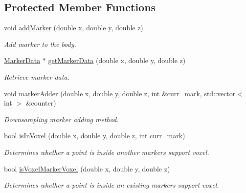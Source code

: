 \subsection*{Protected Member Functions}
\begin{DoxyCompactItemize}
\item 
void \hyperlink{class_body_aa965f7b498528230aa2f56a9abf6bf06}{add\+Marker} (double x, double y, double z)
\begin{DoxyCompactList}\small\item\em Add marker to the body. \end{DoxyCompactList}\item 
\hyperlink{class_marker_data}{Marker\+Data} $\ast$ \hyperlink{class_body_a530c704d7737af163c9ed06d42a373f0}{get\+Marker\+Data} (double x, double y, double z)
\begin{DoxyCompactList}\small\item\em Retrieve marker data. \end{DoxyCompactList}\item 
void \hyperlink{class_body_a3a1ba74da8020cc3ee7f4fffde0b4477}{marker\+Adder} (double x, double y, double z, int \&curr\+\_\+mark, std\+::vector$<$ int $>$ \&counter)
\begin{DoxyCompactList}\small\item\em Downsampling marker adding method. \end{DoxyCompactList}\item 
bool \hyperlink{class_body_aa7733bbcd85af5fa4e8822889fba7b33}{is\+In\+Voxel} (double x, double y, double z, int curr\+\_\+mark)
\begin{DoxyCompactList}\small\item\em Determines whether a point is inside another marker\textquotesingle{}s support voxel. \end{DoxyCompactList}\item 
bool \hyperlink{class_body_a3ed926c01461f32d64b4a5405e920e36}{is\+Voxel\+Marker\+Voxel} (double x, double y, double z)
\begin{DoxyCompactList}\small\item\em Determines whether a point is inside an existing marker\textquotesingle{}s support voxel. \end{DoxyCompactList}\end{DoxyCompactItemize}
